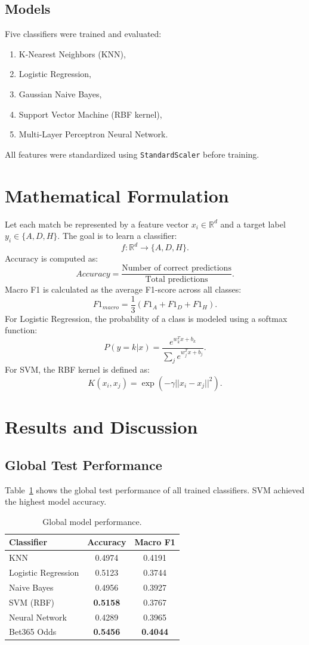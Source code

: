 \documentclass[10pt,a4paper]{article}
\begin{document}
\subsection{Models}
Five classifiers were trained and evaluated:
\begin{enumerate}
    \item K-Nearest Neighbors (KNN),
    \item Logistic Regression,
    \item Gaussian Naive Bayes,
    \item Support Vector Machine (RBF kernel),
    \item Multi-Layer Perceptron Neural Network.
\end{enumerate}
All features were standardized using \texttt{StandardScaler} before training.

\section{Mathematical Formulation}
Let each match be represented by a feature vector \(x_i \in \mathbb{R}^{d}\) and a target label \(y_i \in \{A,D,H\}\). The goal is to learn a classifier:
\[
f: \mathbb{R}^{d} \rightarrow \{A,D,H\}.
\]
Accuracy is computed as:
\[
Accuracy = \frac{\text{Number of correct predictions}}{\text{Total predictions}}.
\]
Macro F1 is calculated as the average F1-score across all classes:
\[
F1_{macro}=\frac{1}{3}(F1_A+F1_D+F1_H).
\]
For Logistic Regression, the probability of a class is modeled using a softmax function:
\[
P(y=k|x)=\frac{e^{w_k^Tx+b_k}}{\sum_j e^{w_j^Tx+b_j}}.
\]
For SVM, the RBF kernel is defined as:
\[
K(x_i,x_j)=\exp(-\gamma ||x_i-x_j||^2).
\]

\section{Results and Discussion}
\subsection{Global Test Performance}
Table~\ref{tab:global} shows the global test performance of all trained classifiers. SVM achieved the highest model accuracy.

\begin{table}[H]
\centering
\caption{Global model performance.}
\label{tab:global}
\begin{tabular}{lcc}
\toprule
Classifier & Accuracy & Macro F1 \\
\midrule
KNN & 0.4974 & 0.4191 \\
Logistic Regression & 0.5123 & 0.3744 \\
Naive Bayes & 0.4956 & 0.3927 \\
SVM (RBF) & \textbf{0.5158} & 0.3767 \\
Neural Network & 0.4289 & 0.3965 \\
Bet365 Odds & \textbf{0.5456} & \textbf{0.4044} \\
\bottomrule
\end{tabular}
\end{table}
\end{document}

